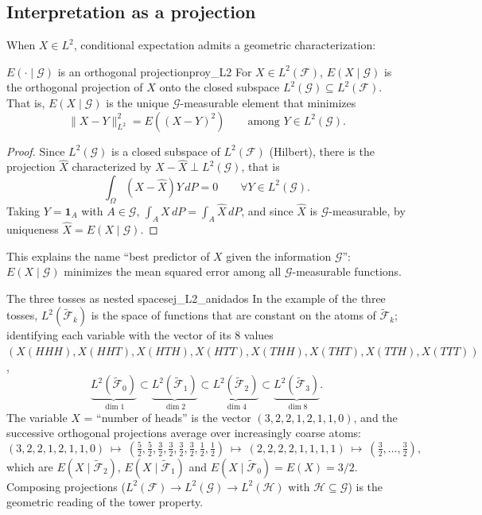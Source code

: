 \documentclass[11pt, a4paper]{article}
\begin{document}
\subsection{Interpretation as a projection}

When $X \in L^2$, conditional expectation admits a geometric characterization:

\begin{teorema}{$E(\cdot \mid \mathcal{G})$ is an orthogonal projection}{proy_L2}
For $X \in L^2(\mathcal{F})$, $E(X \mid \mathcal{G})$ is the orthogonal projection of $X$ onto the
closed subspace $L^2(\mathcal{G}) \subseteq L^2(\mathcal{F})$. That is, $E(X \mid \mathcal{G})$
is the unique $\mathcal{G}$-measurable element that minimizes
$$ \|X - Y\|_{L^2}^2 = E((X - Y)^2) \qquad \text{among } Y \in L^2(\mathcal{G}). $$
\end{teorema}

\begin{proof}
Since $L^2(\mathcal{G})$ is a closed subspace of $L^2(\mathcal{F})$ (Hilbert), there is the
projection $\widehat{X}$ characterized by $X - \widehat{X} \perp L^2(\mathcal{G})$, that is
$$ \int_\Omega (X - \widehat{X}) Y \, dP = 0 \qquad \forall Y \in L^2(\mathcal{G}). $$
Taking $Y = \mathbf{1}_A$ with $A \in \mathcal{G}$, $\int_A X \, dP = \int_A \widehat{X} \, dP$, and
since $\widehat{X}$ is $\mathcal{G}$-measurable, by uniqueness $\widehat{X} = E(X \mid \mathcal{G})$.
\end{proof}

\obs This explains the name ``best predictor of $X$ given the information $\mathcal{G}$'':
$E(X \mid \mathcal{G})$ minimizes the mean squared error among all
$\mathcal{G}$-measurable functions.

\begin{ejemplo}{The three tosses as nested spaces}{ej_L2_anidados}
In the example of the three tosses, $L^2(\widetilde{\mathcal{F}}_k)$ is the space of
functions that are constant on the atoms of $\widetilde{\mathcal{F}}_k$; identifying each
variable with the vector of its $8$ values $(X(HHH), X(HHT), X(HTH), X(HTT), X(THH), X(THT),
X(TTH), X(TTT))$,
$$ \underbrace{L^2(\widetilde{\mathcal{F}}_0)}_{\dim 1} \subset
\underbrace{L^2(\widetilde{\mathcal{F}}_1)}_{\dim 2} \subset
\underbrace{L^2(\widetilde{\mathcal{F}}_2)}_{\dim 4} \subset
\underbrace{L^2(\widetilde{\mathcal{F}}_3)}_{\dim 8}. $$
The variable $X$ = ``number of heads'' is the vector $(3, 2, 2, 1, 2, 1, 1, 0)$, and the
successive orthogonal projections average over increasingly coarse atoms:
$$ (3,2,2,1,2,1,1,0) \ \mapsto \ \left(\tfrac{5}{2}, \tfrac{5}{2}, \tfrac{3}{2}, \tfrac{3}{2},
\tfrac{3}{2}, \tfrac{3}{2}, \tfrac{1}{2}, \tfrac{1}{2}\right) \ \mapsto \ (2,2,2,2,1,1,1,1)
\ \mapsto \ \left(\tfrac{3}{2}, \dots, \tfrac{3}{2}\right), $$
which are $E(X \mid \widetilde{\mathcal{F}}_2)$, $E(X \mid \widetilde{\mathcal{F}}_1)$ and
$E(X \mid \widetilde{\mathcal{F}}_0) = E(X) = 3/2$. Composing projections
($L^2(\mathcal{F}) \to L^2(\mathcal{G}) \to L^2(\mathcal{H})$ with $\mathcal{H} \subseteq
\mathcal{G}$) is the geometric reading of the tower property.
\end{ejemplo}
\end{document}
